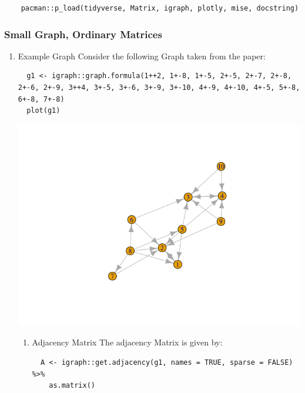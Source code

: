 \documentclass[11pt]{article}
\begin{document}
\lstset{language=r,label= ,caption= ,captionpos=b,numbers=none}
\begin{lstlisting}
    pacman::p_load(tidyverse, Matrix, igraph, plotly, mise, docstring)
\end{lstlisting}

\subsubsection{Small Graph, Ordinary Matrices}
\label{implementing-page-rank-methods}
\begin{enumerate}
\item Example Graph
\label{example-graph}
Consider the following Graph taken from the paper:

\lstset{language=r,label= ,caption= ,captionpos=b,numbers=none}
\begin{lstlisting}
  g1 <- igraph::graph.formula(1++2, 1+-8, 1+-5, 2+-5, 2+-7, 2+-8, 2+-6, 2+-9, 3++4, 3+-5, 3+-6, 3+-9, 3+-10, 4+-9, 4+-10, 4+-5, 5+-8, 6+-8, 7+-8)
  plot(g1)
\end{lstlisting}

\begin{center}
\includegraphics[width=.9\linewidth]{ImplementingPageRank/01PageRank_files/figure-html/unnamed-chunk-2-1.png}
\end{center}

\begin{enumerate}
\item Adjacency Matrix
\label{adjacency-matrix}
The adjacency Matrix is given by:

\lstset{language=r,label= ,caption= ,captionpos=b,numbers=none}
\begin{lstlisting}
  A <- igraph::get.adjacency(g1, names = TRUE, sparse = FALSE) %>%
    as.matrix()


\end{lstlisting}
\end{enumerate}
\end{enumerate}
\end{document}
